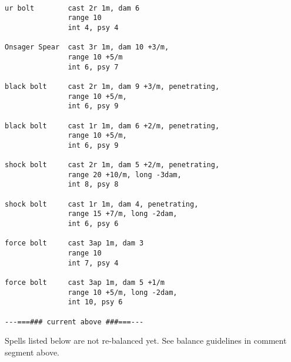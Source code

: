 


\small \begin{verbatim}

ur bolt        cast 2r 1m, dam 6
               range 10
               int 4, psy 4

Onsager Spear  cast 3r 1m, dam 10 +3/m,
               range 10 +5/m
               int 6, psy 7

black bolt     cast 2r 1m, dam 9 +3/m, penetrating,
               range 10 +5/m, 
               int 6, psy 9

black bolt     cast 1r 1m, dam 6 +2/m, penetrating,
               range 10 +5/m,
               int 6, psy 9

shock bolt     cast 2r 1m, dam 5 +2/m, penetrating,
               range 20 +10/m, long -3dam,
               int 8, psy 8

shock bolt     cast 1r 1m, dam 4, penetrating,
               range 15 +7/m, long -2dam,
               int 6, psy 6

force bolt     cast 3ap 1m, dam 3
               range 10
               int 7, psy 4

force bolt     cast 3ap 1m, dam 5 +1/m
               range 10 +5/m, long -2dam,
               int 10, psy 6

---===### current above ###===---
\end{verbatim} \normalsize
\noindent Spells listed below are not re-balanced yet.
See balance guidelines in comment segment above.
